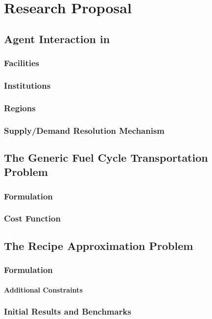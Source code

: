 \chapter{Research Proposal}\label{ch:research}



\section{Agent Interaction in \Cyclus}

\subsection{Facilities}
\subsection{Institutions}
\subsection{Regions}
\subsection{Supply/Demand Resolution Mechanism}

\section{The Generic Fuel Cycle Transportation Problem}

\subsection{Formulation}



\subsection{Cost Function}\label{sec:cost-function}




\section{The Recipe Approximation Problem}



\subsection{Formulation}



\subsubsection{Additional Constraints}
\subsection{Initial Results and Benchmarks}
